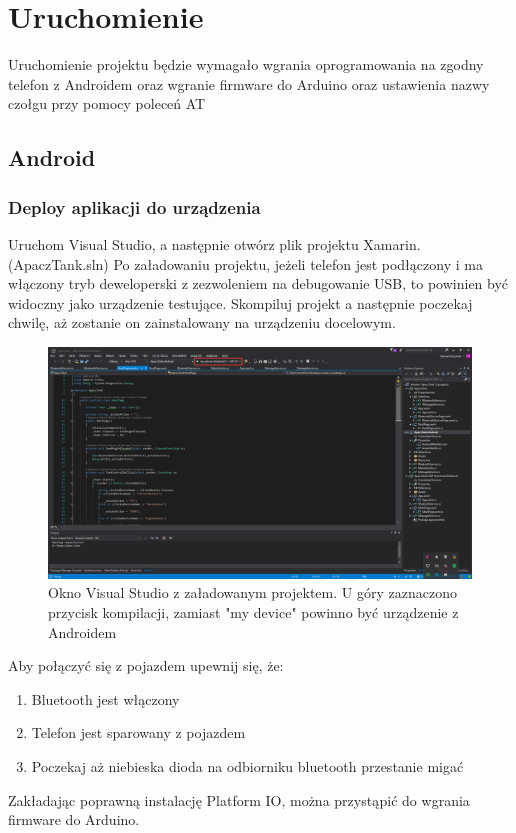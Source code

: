 \documentclass{report}
\begin{document}
    \chapter{Uruchomienie}
        Uruchomienie projektu będzie wymagało wgrania oprogramowania na zgodny telefon z Androidem oraz wgranie firmware do Arduino oraz ustawienia nazwy czołgu przy pomocy poleceń AT
        \section{Android}
	        \subsection{Deploy aplikacji do urządzenia}
	        Uruchom Visual Studio, a następnie otwórz plik projektu Xamarin. (ApaczTank.sln) Po załadowaniu projektu, jeżeli telefon jest podłączony i ma włączony tryb deweloperski z zezwoleniem na debugowanie USB, to powinien być widoczny jako urządzenie testujące. Skompiluj projekt a następnie poczekaj chwilę, aż zostanie on zainstalowany na urządzeniu docelowym.
	        \begin{figure}[H]
	        	\centering
	        	\includegraphics[scale=0.25]{visual_2.png}
	        	\caption{Okno Visual Studio z załadowanym projektem. U góry zaznaczono przycisk kompilacji, zamiast "my
	        		 device"  powinno być urządzenie z Androidem}
	        \end{figure}
	        Aby połączyć się z pojazdem upewnij się, że:
	        \begin{enumerate}
	            \item Bluetooth jest włączony
	            \item Telefon jest sparowany z pojazdem 
	            \item Poczekaj aż niebieska dioda na odbiorniku bluetooth przestanie migać
	        \end{enumerate}
	    	Zakładając poprawną instalację Platform IO, można przystąpić do wgrania firmware do Arduino.
\end{document}
